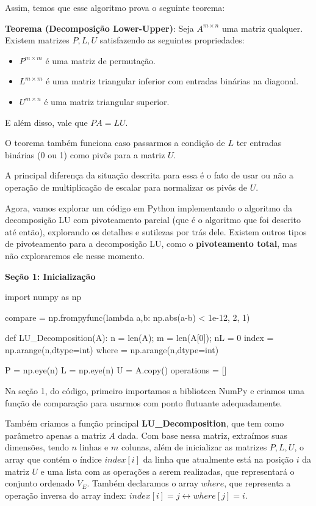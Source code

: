 \documentclass[11pt, a4paper]{article}
\begin{document}
Assim, temos que esse algoritmo prova o seguinte teorema:

\void[0.3]

\textbf{Teorema (Decomposição Lower-Upper)}: Seja \(A^{m\times n}\) uma matriz qualquer. Existem matrizes \(P,L,U\) satisfazendo as seguintes propriedades:

\begin{itemize}
    \item \(P^{m \times m}\) é uma matriz de permutação.
    \void[0.2]
    \item \(L^{m \times m}\) é uma matriz triangular inferior com entradas binárias na diagonal.
    \void[0.2]
    \item \(U^{m \times n}\) é uma matriz triangular superior.
\end{itemize}

E além disso, vale que \(PA=LU\).

\void[0.6]

O teorema também funciona caso passarmos a condição de \(L\) ter entradas binárias (0 ou 1) como pivôs para a matriz \(U\).

A principal diferença da situação descrita para essa é o fato de usar ou não a operação de multiplicação de escalar para normalizar os pivôs de \(U\).

Agora, vamos explorar um código em Python implementando o algoritmo da decomposição LU com pivoteamento parcial (que é o algoritmo que foi descrito até então), explorando os detalhes e sutilezas por trás dele. Existem outros tipos de pivoteamento para a decomposição LU, como o \textbf{pivoteamento total}, mas não exploraremos ele nesse momento.

\textbf{Seção 1: Inicialização}
\begin{code}
import numpy as np

compare = np.frompyfunc(lambda a,b: np.abs(a-b) < 1e-12, 2, 1)

def LU_Decomposition(A):
    n = len(A); m = len(A[0]); nL = 0
    index = np.arange(n,dtype=int)
    where = np.arange(n,dtype=int)

    P = np.eye(n)
    L = np.eye(n)
    U = A.copy()
    operations = []
\end{code}

Na seção 1, do código, primeiro importamos a biblioteca NumPy e criamos uma função de comparação para usarmos com ponto flutuante adequadamente.

Também criamos a função principal \textbf{LU\_Decomposition}, que tem como parâmetro apenas a matriz \(A\) dada. Com base nessa matriz, extraímos suas dimensões, tendo \(n\) linhas e \(m\) colunas, além de inicializar as matrizes \(P,L,U\), o array que contém o índice \(index[i]\) da linha que atualmente está na posição \(i\) da matriz \(U\) e uma lista com as operações a serem realizadas, que representará o conjunto ordenado \(V_E\). Também declaramos o array \(where\), que representa a operação inversa do array index: \(index[i]=j \leftrightarrow where[j]=i\).
\end{document}
